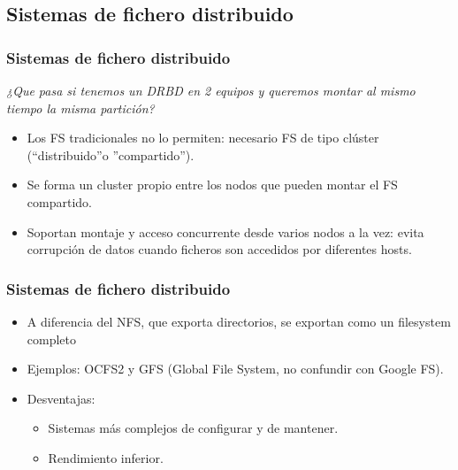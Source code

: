 \documentclass{beamer}
\begin{document}
\subsection{Sistemas de fichero distribuido}
\begin{frame}
  \frametitle{Sistemas de fichero distribuido}

\textit{¿Que pasa si tenemos un DRBD en 2 equipos y queremos montar al mismo tiempo la misma partición?}

  \begin{itemize}
    \item Los FS tradicionales no lo permiten: necesario FS de tipo clúster (``distribuido''o ''compartido'').
    \item Se forma un cluster propio entre los nodos que pueden montar el FS compartido.
    \item Soportan montaje y acceso concurrente desde varios nodos a la vez: evita corrupción de datos cuando ficheros son accedidos por diferentes hosts.
  \end{itemize}
\end{frame}

\begin{frame}
  \frametitle{Sistemas de fichero distribuido}

  \begin{itemize}

    \item A diferencia del NFS, que exporta directorios, se exportan como un filesystem completo 
    \item Ejemplos: OCFS2 y GFS (Global File System, no confundir con Google FS).

    \item Desventajas:

  \begin{itemize}
	\item Sistemas más complejos de configurar y de mantener.
	\item Rendimiento inferior.
  \end{itemize}

  \end{itemize}
\end{frame}
\end{document}
